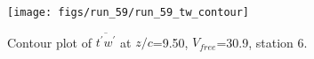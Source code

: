 \begin{figure}[H]
\centering
\texttt{[image: figs/run\_59/run\_59\_tw\_contour]}
\caption{Contour plot of $\overline{t^\prime w^\prime}$ at $z/c$=9.50, $V_{free}$=30.9, station 6.}
\end{figure}


